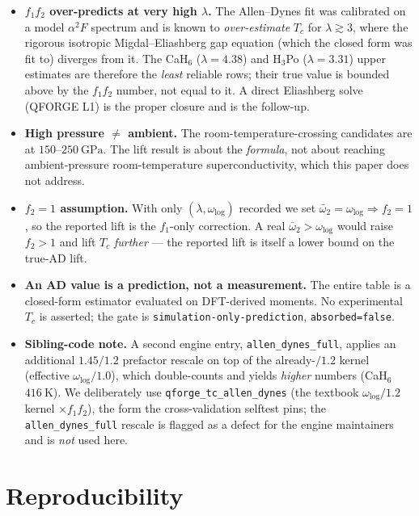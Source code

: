 \documentclass[11pt,a4paper]{article}
\begin{document}
\begin{itemize}\itemsep0.3em
\item \textbf{$f_1 f_2$ over-predicts at very high $\lambda$.} The Allen--Dynes
  fit was calibrated on a model $\alpha^2F$ spectrum and is known to
  \emph{over-estimate} $T_c$ for $\lambda \gtrsim 3$, where the rigorous
  isotropic Migdal--Eliashberg gap equation (which the closed form was fit to)
  diverges from it. The CaH$_6$ ($\lambda{=}4.38$) and H$_3$Po
  ($\lambda{=}3.31$) upper estimates are therefore the \emph{least} reliable
  rows; their true value is bounded above by the $f_1 f_2$ number, not equal to
  it. A direct Eliashberg solve (QFORGE L1) is the proper closure and is the
  follow-up.
\item \textbf{High pressure $\ne$ ambient.} The room-temperature-crossing
  candidates are at $150$--$\SI{250}{\giga\pascal}$. The lift result is about
  the \emph{formula}, not about reaching ambient-pressure room-temperature
  superconductivity, which this paper does not address.
\item \textbf{$f_2{=}1$ assumption.} With only $(\lambda,\omega_{\log})$
  recorded we set $\bar\omega_2=\omega_{\log}\Rightarrow f_2=1$, so the
  reported lift is the $f_1$-only correction. A real $\bar\omega_2>\omega_{\log}$
  would raise $f_2>1$ and lift $T_c$ \emph{further} --- the reported lift is
  itself a lower bound on the true-AD lift.
\item \textbf{An AD value is a prediction, not a measurement.} The entire table
  is a closed-form estimator evaluated on DFT-derived moments. No experimental
  $T_c$ is asserted; the gate is \texttt{simulation-only-prediction},
  \texttt{absorbed=false}.
\item \textbf{Sibling-code note.} A second engine entry, \texttt{allen\_dynes\_full},
  applies an additional $1.45/1.2$ prefactor rescale on top of the already-$/1.2$
  kernel (effective $\omega_{\log}/1.0$), which double-counts and yields
  \emph{higher} numbers (CaH$_6$ $\SI{416}{\kelvin}$). We deliberately use
  \texttt{qforge\_tc\_allen\_dynes} (the textbook $\omega_{\log}/1.2$ kernel
  $\times f_1 f_2$), the form the cross-validation selftest pins; the
  \texttt{allen\_dynes\_full} rescale is flagged as a defect for the engine
  maintainers and is \emph{not} used here.
\end{itemize}

\section{Reproducibility}
\label{sec:repro}
\end{document}
